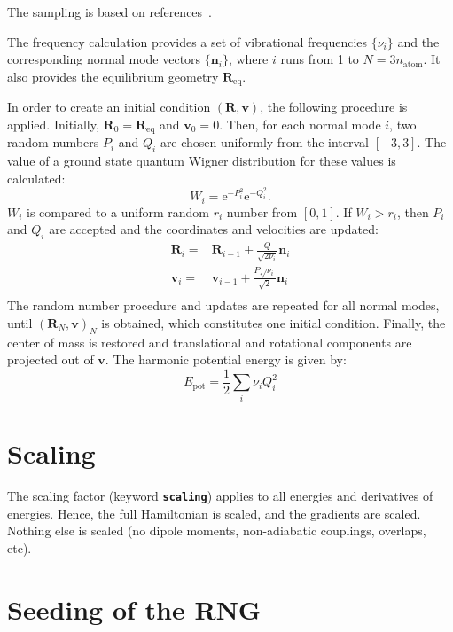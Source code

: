 \documentclass[a4paper,11pt,DIV=15,openany,twoside=false]{scrbook}
\newcommand{\ttt}[1]{\textbf{\texttt{#1}}}
\newcommand{\E}{\ensuremath{\mathrm{e}}}
\newcommand{\VEC}[1]{\ensuremath{\mathbf{#1}}}
\begin{document}
The sampling is based on references~\cite{Dahl1988JCP, Schinke1995}.

The frequency calculation provides a set of vibrational frequencies $\{\nu_i\}$ and the corresponding normal mode vectors $\{\VEC{n}_i\}$, where $i$ runs from 1 to $N=3n_{\text{atom}}$. It also provides the equilibrium geometry $\VEC{R}_{\text{eq}}$.

In order to create an initial condition $(\VEC{R},\VEC{v})$, the following procedure is applied. Initially, $\VEC{R}_0=\VEC{R}_{\text{eq}}$ and $\VEC{v}_0=0$. Then, for each normal mode $i$, two random numbers $P_i$ and $Q_i$ are chosen uniformly from the interval $[-3,3]$. The value of a ground state quantum Wigner distribution for these values is calculated:
\begin{equation}
  W_i=\E^{-P_i^2}\E^{-Q_i^2}.
\end{equation}
$W_i$ is compared to a uniform random $r_i$ number from $[0,1]$. If $W_i>r_i$, then $P_i$ and $Q_i$ are accepted and the coordinates and velocities are updated:
\begin{align}
  \VEC{R}_i=&\VEC{R}_{i-1} + \frac{Q}{\sqrt{2\nu_i}}\VEC{n}_i\\
  \VEC{v}_i=&\VEC{v}_{i-1} + \frac{P\sqrt{\nu_i}}{\sqrt{2}}\VEC{n}_i\\
\end{align}
The random number procedure and updates are repeated for all normal modes, until $(\VEC{R}_N,\VEC{v})_N$ is obtained, which constitutes one initial condition. Finally, the center of mass is restored and translational and rotational components are projected out of $\VEC{v}$. The harmonic potential energy is given by:
\begin{equation}
  E_{\text{pot}}=\frac{1}{2}\sum\limits_i \nu_iQ_i^2
\end{equation}


\section{Scaling}\label{met:scaling}

The scaling factor (keyword \ttt{scaling}) applies to all energies and derivatives of energies. Hence, the full Hamiltonian is scaled, and the gradients are scaled. Nothing else is scaled (no dipole moments, non-adiabatic couplings, overlaps, etc).


\section{Seeding of the RNG}\label{met:seed}
\end{document}
